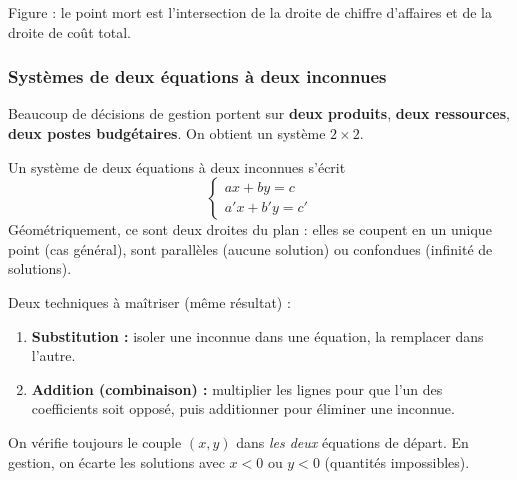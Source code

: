 \documentclass[12pt,a4paper]{article}
\begin{document}
\begin{center}
\end{center}

\begin{center}
{\small\color{mundigray} Figure : le point mort est l'intersection de la droite de chiffre d'affaires et de la droite de coût total.}
\end{center}

\subsubsection{Systèmes de deux équations à deux inconnues}

Beaucoup de décisions de gestion portent sur \textbf{deux produits}, \textbf{deux ressources}, \textbf{deux postes budgétaires}. On obtient un système $2\times 2$.

\begin{definitionbox}
Un système de deux équations à deux inconnues s'écrit
$$\begin{cases} ax+by = c \\ a'x+b'y = c' \end{cases}$$
Géométriquement, ce sont deux droites du plan : elles se coupent en un unique point (cas général), sont parallèles (aucune solution) ou confondues (infinité de solutions).
\end{definitionbox}

\begin{methodebox}
Deux techniques à maîtriser (même résultat) :
\begin{enumerate}[leftmargin=1.3cm]
  \item \textbf{Substitution :} isoler une inconnue dans une équation, la remplacer dans l'autre.
  \item \textbf{Addition (combinaison) :} multiplier les lignes pour que l'un des coefficients soit opposé, puis additionner pour éliminer une inconnue.
\end{enumerate}
On vérifie toujours le couple $(x,y)$ dans \emph{les deux} équations de départ. En gestion, on écarte les solutions avec $x<0$ ou $y<0$ (quantités impossibles).
\end{methodebox}
\end{document}
